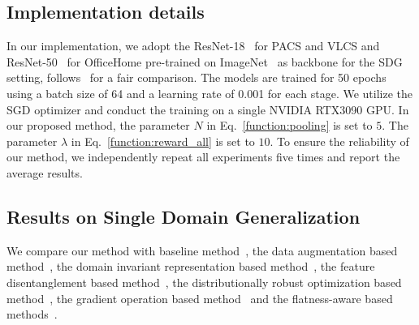 \subsection{Implementation details}
In our implementation, we adopt the ResNet-18~\cite{he2016deep} for PACS and VLCS and ResNet-50~\cite{he2016deep} for OfficeHome pre-trained on ImageNet~\cite{deng2009imagenet} as backbone for the SDG setting, follows~\cite{qu2023modality, shinunknown} for a fair comparison.
The models are trained for 50 epochs using a batch size of 64 and a learning rate of 0.001 for each stage. We utilize the SGD optimizer and conduct the training on a single NVIDIA RTX3090 GPU. 
In our proposed method, the parameter $N$ in Eq.~\ref{function:pooling} is set to $5$. The parameter $\lambda$ in Eq.~\ref{function:reward_all} is set to $10$. 
To ensure the reliability of our method, we independently repeat all experiments five times and report the average results.





\subsection{Results on Single Domain Generalization}
We compare our method with baseline method~\cite{vapnik2013nature}, the data augmentation based method~\cite{nuriel2021permuted, zhou2021domain, zhang2022exact, hendrycks2019augmix, li2022uncertainty, cugu2022attention, chen2023domain, qu2023modality}, the domain invariant representation based method~\cite{ganin2016domain, li2018domain, arjovsky2019invariant, krueger2021out, blanchard2021domain, sun2016deep, huang2020self}, the feature disentanglement based method~\cite{nam2021reducing}, the distributionally robust optimization based method~\cite{sagawa2019distributionally}, the gradient operation based method~\cite{huang2020self, rame2022fishr} and the flatness-aware based methods~\cite{li2018domain, zhuang2022surrogate, wang2023sharpness, shinunknown}.



